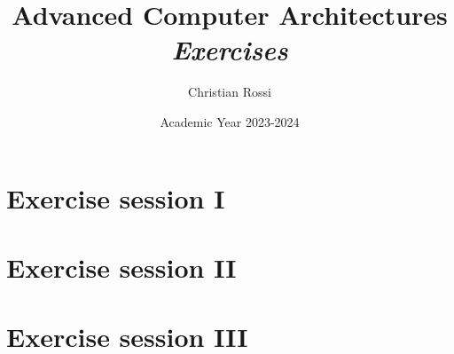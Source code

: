 \documentclass[12pt, a4paper]{report}
\title{Advanced Computer Architectures \\ \textit{Exercises}}
\author{Christian Rossi}
\date{Academic Year 2023-2024}
\begin{document}
    \maketitle

    

    \cleardoublepage{}

    \tableofcontents

    \cleardoublepage{}

    \chapter{Exercise session I}
    
    
    
    

    \chapter{Exercise session II}
    
    

    \chapter{Exercise session III}
    
    
\end{document}
